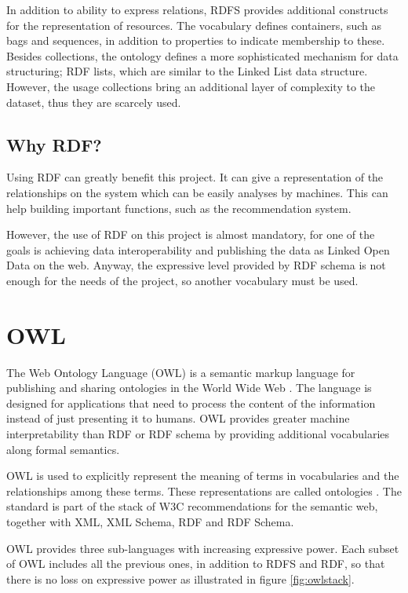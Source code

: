 In addition to ability to express relations, RDFS provides additional constructs for the representation of resources. The vocabulary defines containers, such as bags and sequences, in addition to properties to indicate membership to these. Besides collections, the ontology defines a more sophisticated mechanism for data structuring; RDF lists, which are similar to the Linked List data structure. However, the usage collections bring an additional layer of complexity to the dataset, thus they are scarcely used.

\subsection*{Why RDF?}

Using RDF can greatly benefit this project. It can give a representation of the relationships on the system which can be easily analyses by machines. This can help building important functions, such as the recommendation system.

However, the use of RDF on this project is almost mandatory, for one of the goals is achieving data interoperability and publishing the data as Linked Open Data on the web. Anyway, the expressive level provided by RDF schema is not enough for the needs of the project, so another vocabulary must be used.

\section{OWL}\label{sec:owl}

The Web Ontology Language (OWL) is a semantic markup language for publishing and sharing ontologies in the World Wide Web \cite{bechhofer2009owl}. The language is designed for applications that need to process the content of the information instead of just presenting it to humans. OWL provides greater machine interpretability than RDF or RDF schema by providing additional vocabularies along formal semantics.

OWL is used to explicitly represent the meaning of terms in vocabularies and the relationships among these terms. These representations are called ontologies \cite{mcguinness2004owl}. The standard is part of the stack of W3C recommendations for the semantic web, together with XML, XML Schema, RDF and RDF Schema.

OWL provides three sub-languages with increasing expressive power. Each subset of OWL includes all the previous ones, in addition to RDFS and RDF, so that there is no loss on expressive power as illustrated in figure \ref{fig:owlstack}.

